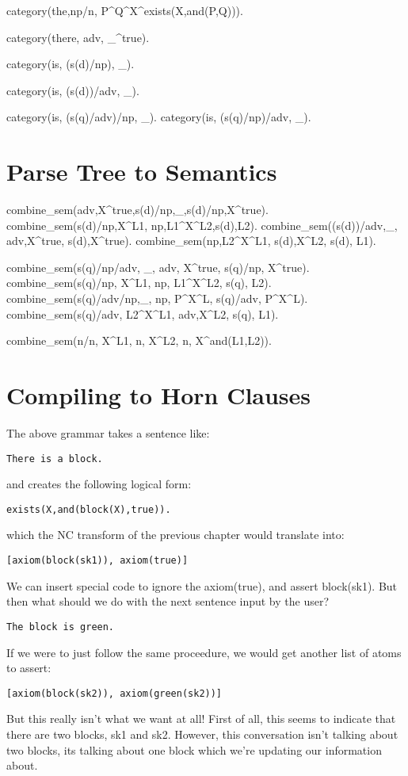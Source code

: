 \documentclass{book}[9pt]
\newenvironment{code}%
{\small \verbatim}%
{\endverbatim \large}
\begin{document}
\begin{code}
category(the,np/n, P^Q^X^exists(X,and(P,Q))).

category(there,  adv, _^true).

category(is, (s(d)/np)\adv, _).

category(is, (s(d)\np)/adv, _).

category(is, (s(q)/adv)/np, _).
category(is, (s(q)/np)/adv, _).

\end{code}

\section{Parse Tree to Semantics}

\begin{code}

combine_sem(adv,X^true,s(d)/np\adv,_,s(d)/np,X^true).
combine_sem(s(d)/np,X^L1, np,L1^X^L2,s(d),L2).
combine_sem((s(d)\np)/adv,_, adv,X^true, s(d)\np,X^true).
combine_sem(np,L2^X^L1, s(d)\np,X^L2, s(d), L1).

combine_sem(s(q)/np/adv, _, adv, X^true, s(q)/np, X^true).
combine_sem(s(q)/np, X^L1, np, L1^X^L2, s(q), L2).
combine_sem(s(q)/adv/np,_, np, P^X^L, s(q)/adv, P^X^L).
combine_sem(s(q)/adv, L2^X^L1, adv,X^L2, s(q), L1).

combine_sem(n/n, X^L1, n, X^L2, n, X^and(L1,L2)).

\end{code}

\section{Compiling to Horn Clauses}

The above grammar takes a sentence like:
\begin{verbatim}
There is a block.
\end{verbatim}
\noindent and creates the following logical form:
\begin{verbatim}
exists(X,and(block(X),true)).
\end{verbatim}
\noindent which the NC transform of the previous chapter
would translate into:
\begin{verbatim}
[axiom(block(sk1)), axiom(true)]
\end{verbatim}
\noindent We can insert special code to ignore the axiom(true),
and assert block(sk1).  But then what should we do with the next
sentence input by the user?
\begin{verbatim}
The block is green.
\end{verbatim}
\noindent If we were to just follow the same proceedure,
we would get another list of atoms to assert:
\begin{verbatim}
[axiom(block(sk2)), axiom(green(sk2))]
\end{verbatim}
\noindent But this really isn't what we want at all!  First of all,
this seems to indicate that there are two blocks, sk1 and sk2.
However, this conversation isn't talking about two blocks, its talking
about one block which we're updating our information about.
\end{document}
